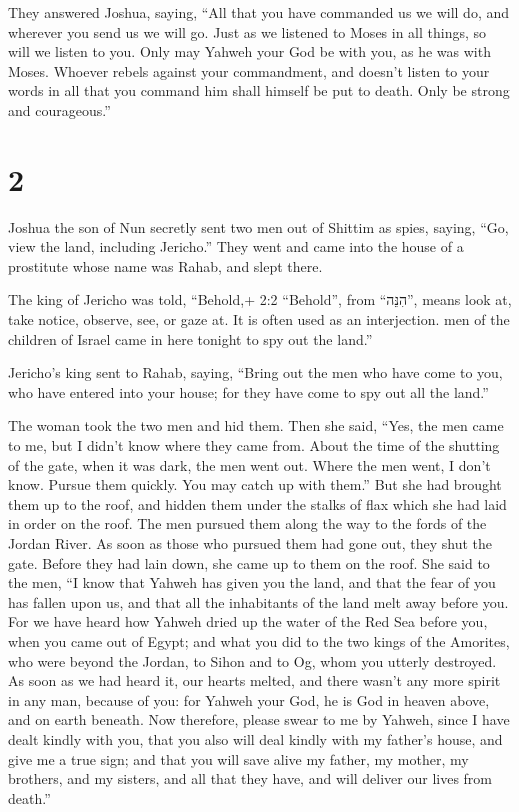  They answered Joshua, saying, ``All that you have
commanded us we will do, and wherever you send us we will go.
 Just as we listened to Moses in all things, so will we
listen to you. Only may Yahweh your God be with you, as he was with
Moses.  Whoever rebels against your commandment, and
doesn't listen to your words in all that you command him shall himself
be put to death. Only be strong and courageous.''

\hypertarget{section-1}{%
\section{2}\label{section-1}}

 Joshua the son of Nun secretly sent two men out of Shittim
as spies, saying, ``Go, view the land, including Jericho.'' They went
and came into the house of a prostitute whose name was Rahab, and slept
there.

 The king of Jericho was told, ``Behold,+ 2:2 ``Behold'',
from ``הִנֵּה'', means look at, take notice, observe, see, or gaze at.
It is often used as an interjection. men of the children of Israel came
in here tonight to spy out the land.''

 Jericho's king sent to Rahab, saying, ``Bring out the men
who have come to you, who have entered into your house; for they have
come to spy out all the land.''

 The woman took the two men and hid them. Then she said,
``Yes, the men came to me, but I didn't know where they came from.
 About the time of the shutting of the gate, when it was
dark, the men went out. Where the men went, I don't know. Pursue them
quickly. You may catch up with them.''  But she had brought
them up to the roof, and hidden them under the stalks of flax which she
had laid in order on the roof.  The men pursued them along
the way to the fords of the Jordan River. As soon as those who pursued
them had gone out, they shut the gate.  Before they had lain
down, she came up to them on the roof.  She said to the men,
``I know that Yahweh has given you the land, and that the fear of you
has fallen upon us, and that all the inhabitants of the land melt away
before you.  For we have heard how Yahweh dried up the
water of the Red Sea before you, when you came out of Egypt; and what
you did to the two kings of the Amorites, who were beyond the Jordan, to
Sihon and to Og, whom you utterly destroyed.  As soon as we
had heard it, our hearts melted, and there wasn't any more spirit in any
man, because of you: for Yahweh your God, he is God in heaven above, and
on earth beneath.  Now therefore, please swear to me by
Yahweh, since I have dealt kindly with you, that you also will deal
kindly with my father's house, and give me a true sign; 
and that you will save alive my father, my mother, my brothers, and my
sisters, and all that they have, and will deliver our lives from
death.''

